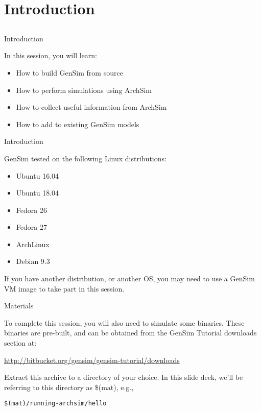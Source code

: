 \section{Introduction}
\subsection{}

\begin{frame}{Introduction}

In this session, you will learn:
\begin{itemize}
\item How to build GenSim from source
\item How to perform simulations using ArchSim
\item How to collect useful information from ArchSim
\item How to add to existing GenSim models
\end{itemize}

\end{frame}


\begin{frame}{Introduction}

GenSim tested on the following Linux distributions:
\begin{itemize}
\item Ubuntu 16.04
\item Ubuntu 18.04
\item Fedora 26
\item Fedora 27
\item ArchLinux
\item Debian 9.3
\end{itemize}

If you have another distribution, or another OS, you may need to use
a GenSim VM image to take part in this session.

\end{frame}

\begin{frame}[fragile]{Materials}

To complete this session, you will also need to simulate some binaries.
These binaries are pre-built, and can be obtained from the GenSim Tutorial
downloads section at:

\url{http://bitbucket.org/gensim/gensim-tutorial/downloads}

Extract this archive to a directory of your choice. In this slide deck,
we'll be referring to this directory as {\ttfamily \$(mat)}, e.g., 
\begin{lstlisting}
$(mat)/running-archsim/hello
\end{lstlisting}

\end{frame}
